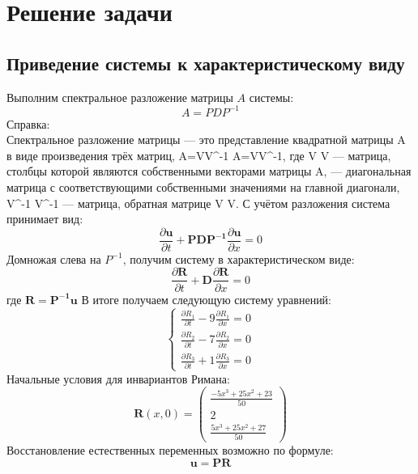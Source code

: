 \documentclass[a4paper,14pt]{article}
\begin{document}
    \section{Решение задачи}
    \subsection{Приведение системы к характеристическому виду}
    Выполним спектральное разложение матрицы $A$ системы:
    \begin{equation}
    A=P D P^{-1}
    \end{equation}
    \vspace{0.5cm}
    \Large Справка:\\
        Спектральное разложение матрицы — это представление квадратной матрицы A в виде произведения трёх матриц, {\displaystyle A=V\Lambda V^{-1}} A=V\Lambda V^{{-1}}, где {\displaystyle V} V — матрица, столбцы которой являются собственными векторами матрицы  A, {\displaystyle \Lambda } \Lambda  — диагональная матрица с соответствующими собственными значениями на главной диагонали, {\displaystyle V^{-1}} V^{{-1}} — матрица, обратная матрице {\displaystyle V} V.
    \vspace{0.5cm}
    С учётом разложения система принимает вид:
    \begin{equation}
    \frac{\partial \mathbf{u}}{\partial t}+\mathbf{P D P^{-1}} \frac{\partial \mathbf{u}}{\partial x}=0
    \end{equation}
    \vspace{0.5cm}
    Домножая слева на $P^{-1}$, получим систему в характеристическом виде:
    \begin{equation}
    \frac{\partial \mathbf{R}}{\partial t}+\mathbf{D} \frac{\partial \mathbf{R}}{\partial x}=0
    \end{equation}
    где $\mathbf{R}=\mathbf{P^{-1}u}$
    \vspace{0.5cm}
    В итоге получаем следующую систему уравнений:
    \begin{equation}
    \begin{cases} \frac{\partial R_1}{\partial t} -9\frac{\partial R_1}{\partial x}=0 \\ \frac{\partial R_2}{\partial t} -7\frac{\partial R_2}{\partial x}=0 \\ \frac{\partial R_3}{\partial t} + 1\frac{\partial R_3}{\partial x}=0 \end{cases}
    \end{equation}
    \newpage
    Начальные условия для инвариантов Римана:
    \begin{equation}
    \mathbf{R}(x, 0) = \left( \begin{array}{c}{\frac{-5x^{3}+25x^{2}+23}{50}} \\ {2} \\ {\frac{5x^{3}+25x^{2}+27}{50}}\end{array}\right)
    \end{equation}
    \vspace{0.5cm}
    Восстановление естественных переменных возможно по формуле:
    \begin{equation}
    \mathbf{u}=\mathbf{PR}
    \end{equation}
    
\end{document}
